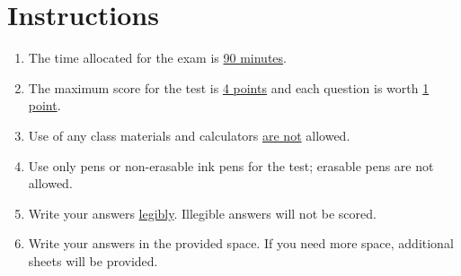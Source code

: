 \section*{Instructions}
\begin{enumerate}
    \item The time allocated for the exam is \underline{90 minutes}.
    \item The maximum score for the test is \underline{4 points} and each question is worth \underline{1 point}. 
    \item Use of any class materials and calculators \underline{are not} allowed.
    \item Use only pens or non-erasable ink pens for the test; erasable pens are not allowed.
    \item Write your answers \underline{legibly}. Illegible answers will not be scored.
    \item Write your answers in the provided space. If you need more space, additional sheets will be provided.
    \vfill
\end{enumerate}